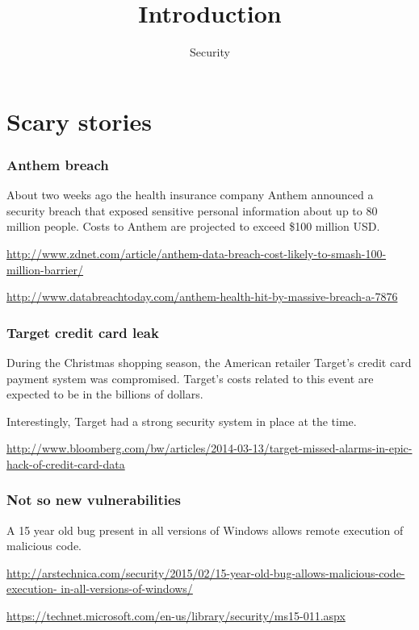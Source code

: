 \documentclass[10pt]{beamer}
\title{Introduction}
\author[IN618]{Security}
\institute[Otago Polytechnic]{
  Otago Polytechnic \\
  Dunedin, New Zealand \\
}
\date{}
\begin{document}
\begin{frame}[plain]
  \titlepage
\end{frame}

\section {Scary stories}

\begin{frame}
	\frametitle{Anthem breach}

	About two weeks ago the health insurance company Anthem 
	announced a security breach that exposed sensitive personal
	information about up to 80 million people.  Costs to Anthem 
	are projected to exceed \$100 million USD.

	\vspace{10mm}
	\url{http://www.zdnet.com/article/anthem-data-breach-cost-likely-to-smash-100-million-barrier/}

	\vspace{10mm}
	\url{http://www.databreachtoday.com/anthem-health-hit-by-massive-breach-a-7876}
\end{frame}

\begin{frame}
	\frametitle{Target credit card leak}

	During the Christmas shopping season, the American retailer Target's
	credit card payment system was compromised.  Target's costs related
	to this event are expected to be in the billions of dollars.

	\vspace{10mm}
	Interestingly, Target had a strong security system in place at the time.

	\vspace{10mm}
	\url{http://www.bloomberg.com/bw/articles/2014-03-13/target-missed-alarms-in-epic-hack-of-credit-card-data}
\end{frame}

\begin{frame}
	\frametitle{Not so new vulnerabilities}

	A 15 year old bug present in all versions of Windows allows 
	remote execution of malicious code.

	\vspace{10mm}
	\url{http://arstechnica.com/security/2015/02/15-year-old-bug-allows-malicious-code-execution-
	in-all-versions-of-windows/}

	\vspace{10mm}
	\url{https://technet.microsoft.com/en-us/library/security/ms15-011.aspx}
\end{frame}
\end{document}
